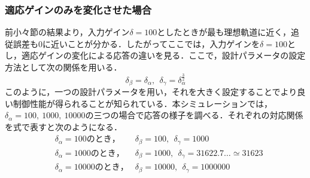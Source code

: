 \documentclass[a4paper,12pt]{jarticle}
\begin{document}
\subsubsection{適応ゲインのみを変化させた場合}
前小々節の結果より，入力ゲイン$ \delta = 100 $としたときが最も理想軌道に近く，追従誤差も0に近いことが分かる．したがってここでは，入力ゲインを$ \delta = 100 $とし，適応ゲインの変化による応答の違いを見る．ここで，設計パラメータの設定方法として次の関係を用いる．
\begin{equation}
 \delta_{\beta} = \delta_{\alpha} , ~~ \delta_{\gamma} = \delta_{\alpha} ^{\frac{3}{2}}
\end{equation}
このように，一つの設計パラメータを用い，それを大きく設定することでより良い制御性能が得られることが知られている{\cite{1}}．本シミュレーションでは，$ \delta_{\alpha} = 100, ~ 1000, ~ 10000 $の三つの場合で応答の様子を調べる．それぞれの対応関係を式で表すと次のようになる．
\begin{eqnarray}
 & \delta_{\alpha} = 100 のとき， & \delta_{\beta} = 100, ~~ \delta_{\gamma} = 1000\\
 & \delta_{\alpha} = 1000 のとき， & \delta_{\beta} = 1000, ~~ \delta_{\gamma} = 31622.7 \dots \simeq 31623 \\
 & \delta_{\alpha} = 10000 のとき， & \delta_{\beta} = 10000, ~~ \delta_{\gamma} = 1000000
\end{eqnarray}
\end{document}
